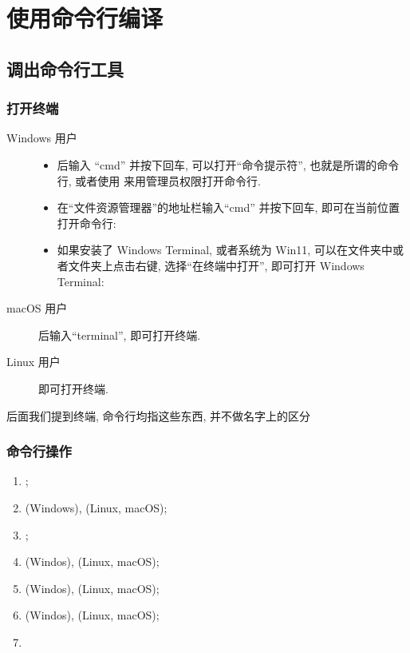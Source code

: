\section{使用命令行编译}

\subsection{调出命令行工具}

\begin{frame}\frametitle{打开终端}
  \begin{description}
    \item[Windows 用户] 
    \begin{itemize}
      \item {} 后输入 ``cmd'' 并按下回车, 可以打开``命令提示符'', 也就是所谓的命令行, 或者使用 \keys{\ctrl + \shift + \enter} 来用管理员权限打开命令行.
      \item 在``文件资源管理器''的地址栏输入``cmd'' 并按下回车, 即可在当前位置打开命令行:
      \item 如果安装了 Windows Terminal, 或者系统为 Win11, 可以在文件夹中或者文件夹上点击右键, 选择``在终端中打开'', 即可打开 Windows Terminal:
    \end{itemize}
    \item[macOS 用户] \keys{\cmdmac + \SPACE} 后输入``terminal'', 即可打开终端. 
    \item[Linux 用户]  即可打开终端. 
  \end{description}
后面我们提到终端, 命令行均指这些东西, 并不做名字上的区分
\end{frame}


\begin{frame}[fragile]
  \frametitle{命令行操作}
  \begin{enumerate}
    \item {};
    \item {} (Windows),  (Linux, macOS);
    \item {};
    \item {} (Windos),  (Linux, macOS);
    \item {} (Windos),  (Linux, macOS);
    \item {} (Windos),  (Linux, macOS);
    \item {}
  \end{enumerate}
\end{frame}


